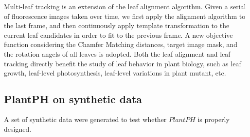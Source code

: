 \documentclass{bioinfo}
\begin{document}
{Multi-leaf tracking is an extension of the leaf alignment algorithm. Given a serial of fluorescence images  taken over time, we first apply the alignment algorithm to the last frame, and then continuously apply template transformation to the current leaf candidates in order to fit to the previous frame. A new objective function considering the Chamfer Matching distances, target image mask, and the rotation angels of all leaves is adopted.
%
Both the leaf alignment and leaf tracking directly benefit the study of leaf behavior in plant biology, such as leaf growth, leaf-level photosynthesis, leaf-level variations in plant mutant, etc.


\subsection{PlantPH on synthetic data}

A set of synthetic data were generated to test whether $PlantPH$ is properly designed.








%
%




}
\end{document}
